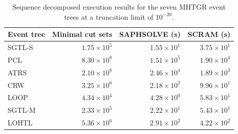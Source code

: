 \begin{table}[]
\centering
\caption{Sequence decomposed execution results for the seven MHTGR event trees at a truncation limit of $10^{-20}$.}
\label{tab:mhtgr_robust_run2}
\small
\begin{tabular}{@{}lrrr@{}}
\toprule
\textbf{Event tree} & \textbf{Minimal cut sets} & \textbf{SAPHSOLVE (s)} & \textbf{SCRAM (s)} \\
\midrule
SGTL-S & $1.75 \times 10^{5}$ & $1.55 \times 10^{1}$ & $3.75 \times 10^{1}$ \\
PCL & $8.30 \times 10^{8}$ & $1.51 \times 10^{5}$ & $1.90 \times 10^{4}$ \\
ATRS & $2.10 \times 10^{8}$ & $2.46 \times 10^{4}$ & $1.89 \times 10^{3}$ \\
CRW & $3.25 \times 10^{6}$ & $2.18 \times 10^{2}$ & $9.96 \times 10^{1}$ \\
LOOP & $4.34 \times 10^{4}$ & $4.28 \times 10^{0}$ & $5.83 \times 10^{1}$ \\
SGTL-M & $2.33 \times 10^{5}$ & $2.22 \times 10^{1}$ & $5.43 \times 10^{1}$ \\
LOHTL & $5.36 \times 10^{6}$ & $2.91 \times 10^{2}$ & $4.22 \times 10^{2}$ \\
\bottomrule
\end{tabular}
\end{table}